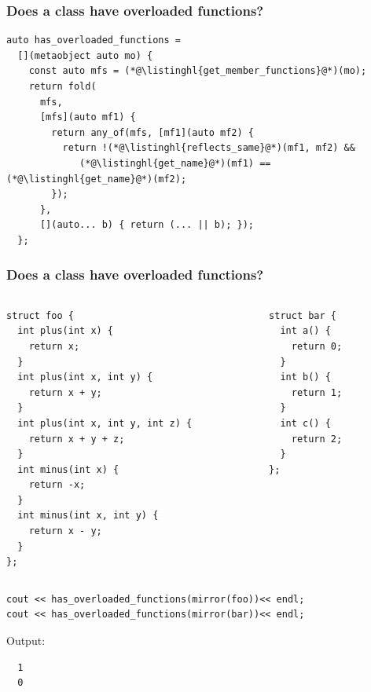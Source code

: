 \documentclass[compress,table,xcolor=table]{beamer}
\begin{document}
\begin{frame}[fragile]
  \frametitle{Does a class have overloaded functions?}
  \begin{lstlisting}[language=c++2x,basicstyle=\footnotesize\ttfamily]
auto has_overloaded_functions =
  [](metaobject auto mo) {
    const auto mfs = (*@\listinghl{get_member_functions}@*)(mo);
    return fold(
      mfs,
      [mfs](auto mf1) {
        return any_of(mfs, [mf1](auto mf2) {
          return !(*@\listinghl{reflects_same}@*)(mf1, mf2) &&
             (*@\listinghl{get_name}@*)(mf1) == (*@\listinghl{get_name}@*)(mf2);
        });
      },
      [](auto... b) { return (... || b); });
  };
  \end{lstlisting}
\end{frame}
\begin{frame}[fragile]
  \frametitle{Does a class have overloaded functions?}
  \begin{columns}
    \begin{column}{.50\textwidth}
      \begin{lstlisting}[language=c++2x,basicstyle=\tiny\ttfamily]
struct foo {
  int plus(int x) {
    return x;
  }
  int plus(int x, int y) {
    return x + y;
  }
  int plus(int x, int y, int z) {
    return x + y + z;
  }
  int minus(int x) {
    return -x;
  }
  int minus(int x, int y) {
    return x - y;
  }
};
      \end{lstlisting}
    \end{column}
    \begin{column}{.40\textwidth}
      \begin{lstlisting}[language=c++2x,basicstyle=\scriptsize\ttfamily]
struct bar {
  int a() {
    return 0;
  }
  int b() {
    return 1;
  }
  int c() {
    return 2;
  }
};
      \end{lstlisting}
    \end{column}
  \end{columns}
  \begin{lstlisting}[language=c++2x,basicstyle=\footnotesize\ttfamily]
cout << has_overloaded_functions(mirror(foo))<< endl;
cout << has_overloaded_functions(mirror(bar))<< endl;
  \end{lstlisting}
  Output:
  \begin{verbatim}
  1
  0
  \end{verbatim}
\end{frame}
\end{document}
